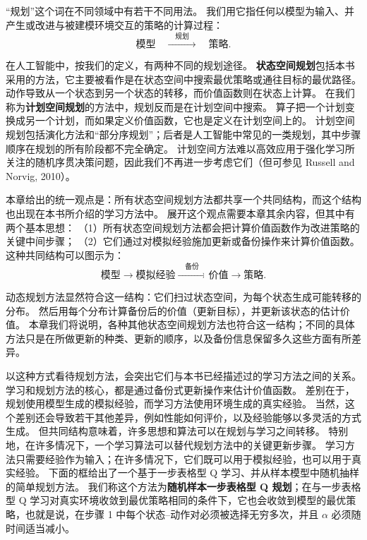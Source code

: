 \documentclass[UTF8,12pt,a4paper,fontset=fandol]{ctexart}
\begin{document}
“规划”这个词在不同领域中有若干不同用法。
我们用它指任何以模型为输入、并产生或改进与被建模环境交互的策略的计算过程：
\[
\text{模型}\quad \xrightarrow{\quad \text{规划}\quad}\quad \text{策略}.
\]

在人工智能中，按我们的定义，有两种不同的规划途径。
\textbf{状态空间规划}包括本书采用的方法，它主要被看作是在状态空间中搜索最优策略或通往目标的最优路径。
动作导致从一个状态到另一个状态的转移，而价值函数则在状态上计算。
在我们称为\textbf{计划空间规划}的方法中，规划反而是在计划空间中搜索。
算子把一个计划变换成另一个计划，而如果定义价值函数，它也是定义在计划空间上的。
计划空间规划包括演化方法和“部分序规划”；后者是人工智能中常见的一类规划，其中步骤顺序在规划的所有阶段都不完全确定。
计划空间方法难以高效应用于强化学习所关注的随机序贯决策问题，因此我们不再进一步考虑它们（但可参见 Russell and Norvig, 2010）。

本章给出的统一观点是：所有状态空间规划方法都共享一个共同结构，而这个结构也出现在本书所介绍的学习方法中。
展开这个观点需要本章其余内容，但其中有两个基本思想：
（1）所有状态空间规划方法都会把计算价值函数作为改进策略的关键中间步骤；
（2）它们通过对模拟经验施加更新或备份操作来计算价值函数。
这种共同结构可以图示为：
\[
\text{模型}
\longrightarrow
\text{模拟经验}
\xrightarrow{\quad \text{备份}\quad}
\text{价值}
\longrightarrow
\text{策略}.
\]

动态规划方法显然符合这一结构：它们扫过状态空间，为每个状态生成可能转移的分布。
然后用每个分布计算备份后的价值（更新目标），并更新该状态的估计价值。
本章我们将说明，各种其他状态空间规划方法也符合这一结构；不同的具体方法只是在所做更新的种类、更新的顺序，以及备份信息保留多久这些方面有所差异。

以这种方式看待规划方法，会突出它们与本书已经描述过的学习方法之间的关系。
学习和规划方法的核心，都是通过备份式更新操作来估计价值函数。
差别在于，规划使用模型生成的模拟经验，而学习方法使用环境生成的真实经验。
当然，这个差别还会导致若干其他差异，例如性能如何评价，以及经验能够以多灵活的方式生成。
但共同结构意味着，许多思想和算法可以在规划与学习之间转移。
特别地，在许多情况下，一个学习算法可以替代规划方法中的关键更新步骤。
学习方法只需要经验作为输入；在许多情况下，它们既可以用于模拟经验，也可以用于真实经验。
下面的框给出了一个基于一步表格型 Q 学习、并从样本模型中随机抽样的简单规划方法。
我们称这个方法为\textbf{随机样本一步表格型 Q 规划}；在与一步表格型 Q 学习对真实环境收敛到最优策略相同的条件下，它也会收敛到模型的最优策略，也就是说，在步骤 1 中每个状态--动作对必须被选择无穷多次，并且 $\alpha$ 必须随时间适当减小。
\end{document}
